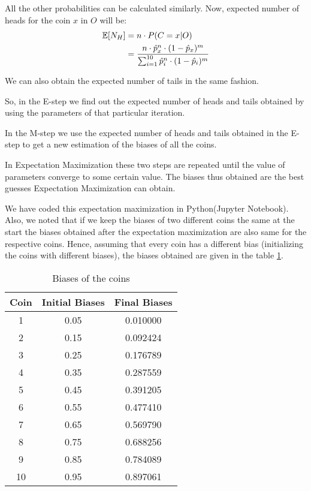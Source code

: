 \documentclass[journal, compsoc]{IEEEtran}
\begin{document}
All the other probabilities can be calculated similarly. Now, expected number of heads for the coin $x$ in $O$ will be:
\begin{equation}
\label{eqn:heads}
\begin{aligned}
\mathbb{E}[N_{H}] &= n \cdot P(C = x | O) \hspace{2mm}\\
&= \frac{n\cdot \hat{p}_{x}^{n}\cdot (1 - \hat{p}_{x})^{m}}{\sum_{i = 1}^{10} \hat{p}_{i}^{n}\cdot (1 - \hat{p}_{i})^{m}}
\end{aligned}
\end{equation}

We can also obtain the expected number of tails in the same fashion.

So, in the E-step we find out the expected number of heads and tails obtained by using the parameters of that particular iteration.

In the M-step we use the expected number of heads and tails obtained in the E-step to get a new estimation of the biases of all the coins.

In Expectation Maximization these two steps are repeated until the value of parameters converge to some certain value. The biases thus obtained
are the best guesses Expectation Maximization can obtain.

We have coded this expectation maximization in Python(Jupyter Notebook). Also, we noted that if we keep the biases of two different coins the same
at the start the biases obtained after the expectation maximization are also same for the respective coins.
Hence, assuming that every coin has a different bias (initializing the coins with different biases),
the biases obtained are given in the table \ref{table:biases}.
\begin{table}[!h]
\renewcommand{\arraystretch}{0.4}
\caption{Biases of the coins}
\label{table:biases}
\centering
\begin{tabular}{|c|c|c|}
\hline
{\bfseries Coin} & {\bfseries Initial Biases} & {\bfseries Final Biases}\\
\hline\hline
1 & 0.05 & 0.010000\\
\hline
2 & 0.15 & 0.092424\\
\hline
3 & 0.25 & 0.176789\\
\hline
4 & 0.35 & 0.287559\\
\hline
5 & 0.45 & 0.391205\\
\hline
6 & 0.55 & 0.477410\\
\hline
7 & 0.65 & 0.569790\\
\hline
8 & 0.75 & 0.688256\\
\hline
9 & 0.85 & 0.784089\\
\hline
10 & 0.95 & 0.897061\\
\hline
\end{tabular}
\end{table}

\nocite{Do2008}

\end{document}
